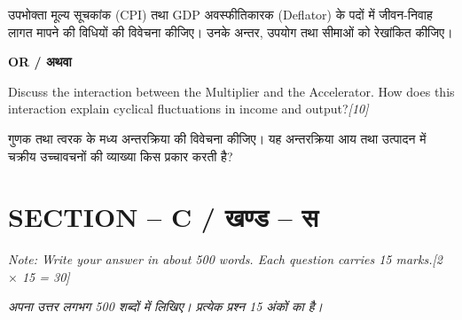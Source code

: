 \documentclass[11pt,a4paper]{article}
\newcommand{\pts}[1]{\hfill \textit{[#1]}}
\begin{document}
\begin{enumerate}[label=\textbf{\arabic*.},leftmargin=*,start=2,itemsep=12pt]
  उपभोक्ता मूल्य सूचकांक (CPI) तथा GDP अवस्फीतिकारक (Deflator) के पदों में जीवन-निवाह लागत मापने की विधियों की विवेचना कीजिए। उनके अन्तर, उपयोग तथा सीमाओं को रेखांकित कीजिए।

  \begin{center}\textbf{OR / अथवा}\end{center}

  Discuss the interaction between the Multiplier and the Accelerator. How does this interaction explain cyclical fluctuations in income and output?\pts{10}
  
  गुणक तथा त्वरक के मध्य अन्तरक्रिया की विवेचना कीजिए। यह अन्तरक्रिया आय तथा उत्पादन में चक्रीय उच्चावचनों की व्याख्या किस प्रकार करती है?

\end{enumerate}

\bigskip

\section*{SECTION -- C / खण्ड -- स}
\noindent \textit{Note: Write your answer in about 500 words. Each question carries 15 marks.}\pts{2 $\times$ 15 = 30}

\noindent \textit{अपना उत्तर लगभग 500 शब्दों में लिखिए। प्रत्येक प्रश्न 15 अंकों का है।}
\end{document}
